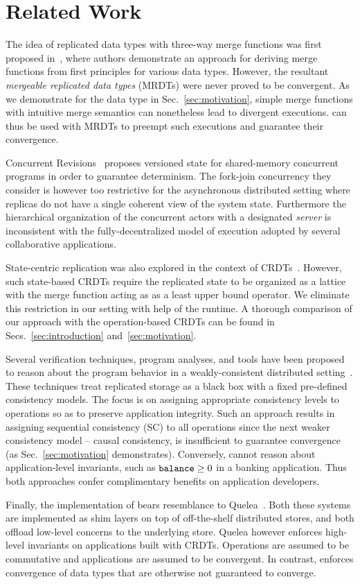 \section{Related Work}
\label{sec:related}

The idea of replicated data types with three-way merge functions was
first proposed in~\cite{mrdt}, where authors demonstrate an approach
for deriving merge functions from first principles for various data
types. However, the resultant \emph{mergeable replicated data types}
(MRDTs) were never proved to be convergent. As we demonstrate for
the  data type in Sec.~\ref{sec:motivation}, simple merge
functions with intuitive merge semantics can nonetheless lead to
divergent executions. \quark can thus be used with MRDTs to preempt
such executions and guarantee their convergence.

Concurrent Revisions~\cite{BBL+10} proposes versioned state for
shared-memory concurrent programs in order to guarantee determinism.
The fork-join concurrency they consider is however too restrictive for
the asynchronous distributed setting where replicas do not have a
single coherent view of the system state.  Furthermore the
hierarchical organization of the concurrent actors with a designated
\emph{server} is inconsistent with the fully-decentralized model of
execution adopted by several collaborative applications.

State-centric replication was also explored in the context of
CRDTs~\cite{crdts}. However, such state-based CRDTs require the
replicated state to be organized as a lattice with the merge function
acting as as a least upper bound operator. We eliminate this
restriction in our setting with help of the \quark runtime. A thorough
comparison of our approach with the operation-based CRDTs can be found
in Secs.~\ref{sec:introduction} and~\ref{sec:motivation}.

Several verification techniques, program analyses, and tools have been
proposed to reason about the program behavior in a weakly-consistent
distributed setting~\cite{bailis-vldb, alvaro-calm,
gotsman-popl16,redblue-atc, redblue-osdi, ecinec}. These techniques
treat replicated storage as a black box with a fixed pre-defined
consistency models. The focus is on assigning appropriate consistency
levels to operations so as to preserve application integrity. Such an
approach results in assigning sequential consistency (SC) to all
operations since the next weaker consistency model -- causal
consistency, is insufficient to guarantee convergence (as
Sec.~\ref{sec:motivation} demonstrates). Conversely, \quark cannot
reason about application-level invariants, such as ${\tt balance}\ge 0$
in a banking application. Thus both approaches confer complimentary
benefits on application developers.

Finally, the implementation of \quark bears resemblance to
Quelea~\cite{pldi15}. Both these systems are implemented as shim
layers on top of off-the-shelf distributed stores, and both offload
low-level concerns to the underlying store. Quelea however enforces
high-level invariants on applications built with CRDTs. Operations are
assumed to be commutative and applications are assumed to be
convergent. In contrast, \quark enforces convergence of data types
that are otherwise not guaranteed to converge.

